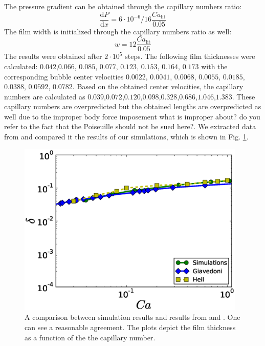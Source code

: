 \documentclass{article}
\newcommand{\todo}[1]{{\color{red}#1}}
\begin{document}
The pressure gradient can be obtained through the capillary numbers
ratio:
\begin{equation}
\frac{\mathrm{d}P}{\mathrm{d} x}=6 \cdot 10^{-6}/16 \frac{Ca_{\mathrm{lit}}}{0.05}
\end{equation}
The film width is initialized through the capillary numbers ratio as well:
\begin{equation*}
w=12 \frac{Ca_{\mathrm{lit}}}{0.05}
\end{equation*}
The results were obtained after $2\cdot10^5$ steps. The following film thicknesses were
calculated: $0.042$,$0.066$, $0.085$, $0.077$, $0.123$, $0.153$, $0.164$, $0.173$ with
the corresponding bubble center velocities $0.0022$, $0.0041$, $0.0068$, $0.0055$,
$0.0185$, $0.0388$, $0.0592$, $0.0782$. Based on the obtained center velocities,
the capillary numbers are calculated as
$0.039$,$0.072$,$0.120$,$0.098$,$0.328$,$0.686$,$1.046$,$1.383$. These
capillary numbers are overpredicted but the obtained lengths are overpredicted
as well due to the improper body force imposement \todo{what is improper about? do you refer
to the fact that the Poiseuille should not be sued here?}.  We extracted data from
\cite{giavedoni-numerical,heil-bretherton} and compared it the results of our
simulations, which is shown in Fig. \ref{fig:capillary:comparison}.
\begin{figure}
\includegraphics[width=0.97\textwidth]{Figures/Capillary/capillaries_comparison.eps}
\caption{A comparison between simulation results and results from
\cite{giavedoni-numerical} and \cite{heil-bretherton}. One can see a
reasonable agreement. The plots depict the film thickness as a function of the
the capillary number.\label{fig:capillary:comparison}}
\end{figure}
\end{document}
